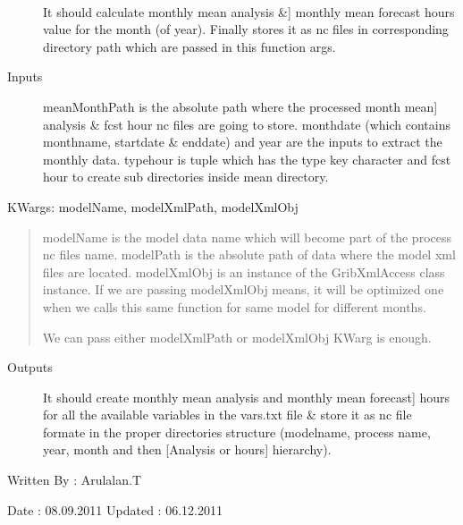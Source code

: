 \documentclass[letterpaper,10pt,english]{sphinxmanual}
\begin{document}

\begin{fulllineitems}
\label{diagnosis:compute_month_mean.genMonthMeanFiles}~\begin{description}
\item[{}] \leavevmode{[}It should calculate monthly mean analysis \&{]}
monthly mean forecast hours value for the month (of year). Finally
stores it as nc files in corresponding directory path which are
passed in this function args.

\item[{Inputs}] \leavevmode{[}meanMonthPath is the absolute path where the processed month mean{]}
analysis \& fcst hour nc files are going to store.
monthdate (which contains monthname, startdate \& enddate) and
year are the inputs to extract the monthly data.
typehour is tuple which has the type key character and fcst hour
to create sub directories inside mean directory.

\end{description}

KWargs: modelName, modelXmlPath, modelXmlObj
\begin{quote}

modelName is the model data name which will become part of the
process nc files name.
modelPath is the absolute path of data where the model xml files
are located.
modelXmlObj is an instance of the GribXmlAccess class instance.
If we are passing modelXmlObj means, it will be optimized one
when we calls this same function for same model for different
months.

We can pass either modelXmlPath or modelXmlObj KWarg is enough.
\end{quote}
\begin{description}
\item[{Outputs}] \leavevmode{[}It should create monthly mean analysis and monthly mean forecast{]}
hours for all the available variables in the vars.txt file \&
store it as nc file formate in the proper directories structure
(modelname, process name, year, month and then
{[}Analysis or hours{]} hierarchy).

\end{description}

Written By : Arulalan.T

Date : 08.09.2011
Updated : 06.12.2011

\end{fulllineitems}
\end{document}
